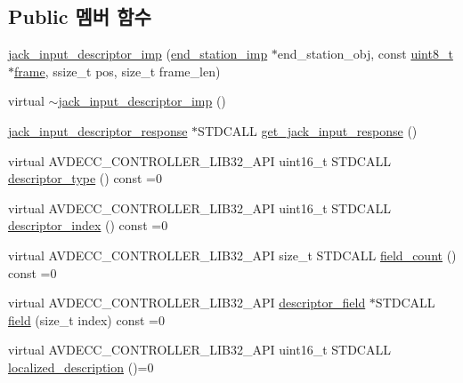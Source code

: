\subsection*{Public 멤버 함수}
\begin{DoxyCompactItemize}
\item 
\hyperlink{classavdecc__lib_1_1jack__input__descriptor__imp_aafaeb835a312da62db54e17fd6eab918}{jack\+\_\+input\+\_\+descriptor\+\_\+imp} (\hyperlink{classavdecc__lib_1_1end__station__imp}{end\+\_\+station\+\_\+imp} $\ast$end\+\_\+station\+\_\+obj, const \hyperlink{stdint_8h_aba7bc1797add20fe3efdf37ced1182c5}{uint8\+\_\+t} $\ast$\hyperlink{gst__avb__playbin_8c_ac8e710e0b5e994c0545d75d69868c6f0}{frame}, ssize\+\_\+t pos, size\+\_\+t frame\+\_\+len)
\item 
virtual \hyperlink{classavdecc__lib_1_1jack__input__descriptor__imp_af2ed7284e19fe97b61a5e07aacd9a697}{$\sim$jack\+\_\+input\+\_\+descriptor\+\_\+imp} ()
\item 
\hyperlink{classavdecc__lib_1_1jack__input__descriptor__response}{jack\+\_\+input\+\_\+descriptor\+\_\+response} $\ast$S\+T\+D\+C\+A\+LL \hyperlink{classavdecc__lib_1_1jack__input__descriptor__imp_a06a14d999649edeca8f726b3c241e560}{get\+\_\+jack\+\_\+input\+\_\+response} ()
\item 
virtual A\+V\+D\+E\+C\+C\+\_\+\+C\+O\+N\+T\+R\+O\+L\+L\+E\+R\+\_\+\+L\+I\+B32\+\_\+\+A\+PI uint16\+\_\+t S\+T\+D\+C\+A\+LL \hyperlink{classavdecc__lib_1_1descriptor__base_a5112b70022171063ec5d3242bee9910e}{descriptor\+\_\+type} () const =0
\item 
virtual A\+V\+D\+E\+C\+C\+\_\+\+C\+O\+N\+T\+R\+O\+L\+L\+E\+R\+\_\+\+L\+I\+B32\+\_\+\+A\+PI uint16\+\_\+t S\+T\+D\+C\+A\+LL \hyperlink{classavdecc__lib_1_1descriptor__base_a7eed5583bffdf72d89021b188648c1b5}{descriptor\+\_\+index} () const =0
\item 
virtual A\+V\+D\+E\+C\+C\+\_\+\+C\+O\+N\+T\+R\+O\+L\+L\+E\+R\+\_\+\+L\+I\+B32\+\_\+\+A\+PI size\+\_\+t S\+T\+D\+C\+A\+LL \hyperlink{classavdecc__lib_1_1descriptor__base_ab1edf4996377ed957088a7b3b16aca7d}{field\+\_\+count} () const =0
\item 
virtual A\+V\+D\+E\+C\+C\+\_\+\+C\+O\+N\+T\+R\+O\+L\+L\+E\+R\+\_\+\+L\+I\+B32\+\_\+\+A\+PI \hyperlink{classavdecc__lib_1_1descriptor__field}{descriptor\+\_\+field} $\ast$S\+T\+D\+C\+A\+LL \hyperlink{classavdecc__lib_1_1descriptor__base_aa3716832eed0b6f6dcfba358c5d2c601}{field} (size\+\_\+t index) const =0
\item 
virtual A\+V\+D\+E\+C\+C\+\_\+\+C\+O\+N\+T\+R\+O\+L\+L\+E\+R\+\_\+\+L\+I\+B32\+\_\+\+A\+PI uint16\+\_\+t S\+T\+D\+C\+A\+LL \hyperlink{classavdecc__lib_1_1descriptor__base_a1fb9de45567df344090a1407aa6b775f}{localized\+\_\+description} ()=0

\end{DoxyCompactItemize}

